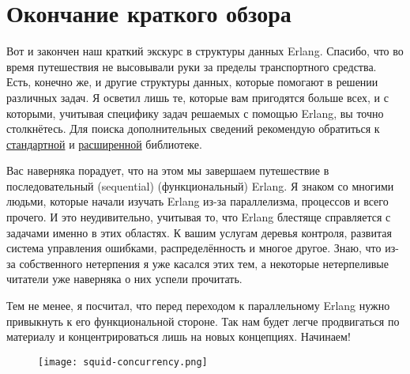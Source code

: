 \section{Окончание краткого обзора}
Вот и закончен наш краткий экскурс в структуры данных Erlang.
Спасибо, что во время путешествия не высовывали руки за пределы транспортного средства.
Есть, конечно же, и другие структуры данных, которые помогают в решении различных задач.
Я осветил лишь те, которые вам пригодятся больше всех, и с которыми, учитывая специфику задач решаемых с помощью  Erlang, вы точно столкнётесь.
Для поиска дополнительных сведений рекомендую обратиться к \href{http://www.erlang.org/doc/apps/stdlib/index.html}{стандартной} и \href{http://www.erlang.org/doc/applications.html}{расширенной} библиотеке.

Вас наверняка порадует, что на этом мы завершаем путешествие в последовательный (sequential) (функциональный) Erlang.
Я знаком со многими людьми, которые начали изучать  Erlang из\--за параллелизма, процессов и всего прочего.
И это неудивительно, учитывая то, что Erlang блестяще справляется с задачами именно в этих областях.
К вашим услугам деревья контроля, развитая система управления ошибками, распределённость и многое другое.
Знаю, что из\--за собственного нетерпения я уже касался этих тем, а некоторые нетерпеливые читатели уже наверняка о них успели прочитать.

Тем не менее, я посчитал, что перед переходом к параллельному Erlang нужно привыкнуть к его функциональной стороне.
Так нам будет легче продвигаться по материалу и концентрироваться лишь на новых концепциях.
Начинаем!
\begin{figure}[h!]
    \centering
    \texttt{[image: squid-concurrency.png]}
\end{figure}
